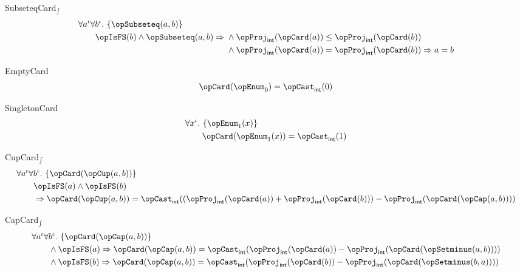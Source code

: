 \documentclass[11pt, a4paper, oneside]{article}
\begin{document}
\begin{axioms}
\item[SubseteqCard$_\int$] \[
        \begin{aligned}
            &\forall a^\idv \forall b^\idv.\, \st{ \opSubseteq(a, b) } \\
            &\qquad \opIsFS(b) \wedge \opSubseteq(a, b) \imp \begin{aligned}[t]
                &\wedge \opProj_\int(\opCard(a)) \le \opProj_\int(\opCard(b)) \\
                &\wedge \opProj_\int(\opCard(a)) = \opProj_\int(\opCard(b)) \imp a = b
            \end{aligned}
        \end{aligned}
    \]

\item[EmptyCard] \[
        \opCard(\opEnum_0) = \opCast_\int(0)
    \]

\item[SingletonCard] \[
        \begin{aligned}
            &\forall x^\idv.\, \st{ \opEnum_1(x) } \\
            &\qquad \opCard(\opEnum_1(x)) = \opCast_\int(1)
        \end{aligned}
    \]

\item[CupCard$_\int$] \[
        \begin{aligned}
            &\forall a^\idv \forall b^\idv.\, \st{ \opCard(\opCup(a, b)) } \\
            &\qquad \opIsFS(a) \wedge \opIsFS(b) \\
            &\qquad \imp \opCard(\opCup(a, b)) = \opCast_\int((\opProj_\int(\opCard(a)) + \opProj_\int(\opCard(b))) - \opProj_\int(\opCard(\opCap(a, b))))
        \end{aligned}
    \]

\item[CapCard$_\int$] \[
        \begin{aligned}
            &\forall a^\idv \forall b^\idv.\, \st{ \opCard(\opCap(a, b)) } \\
            &\qquad \begin{aligned}[t]
                &\wedge \opIsFS(a) \imp \opCard(\opCap(a, b)) = \opCast_\int(\opProj_\int(\opCard(a)) - \opProj_\int(\opCard(\opSetminus(a, b)))) \\
                &\wedge \opIsFS(b) \imp \opCard(\opCap(a, b)) = \opCast_\int(\opProj_\int(\opCard(b)) - \opProj_\int(\opCard(\opSetminus(b, a))))
            \end{aligned}
        \end{aligned}
    \]


\end{axioms}
\end{document}
